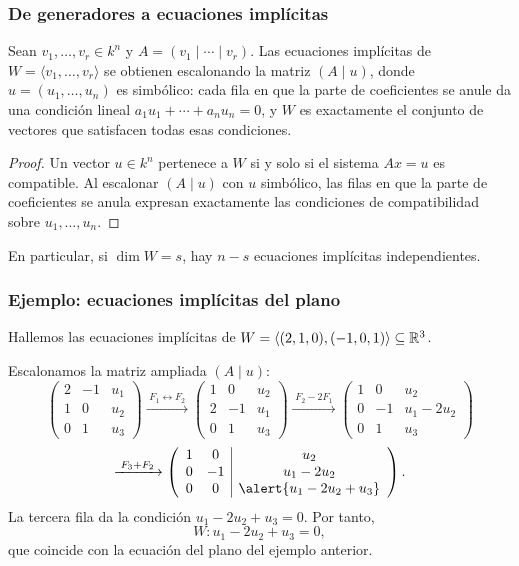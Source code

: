 \begin{frame}[allowframebreaks, t]
    \frametitle{De generadores a ecuaciones implícitas}

    \begin{proposition}
        Sean $v_1,\ldots,v_r\in k^n$ y $A=(v_1\mid\cdots\mid v_r)$.
        Las ecuaciones implícitas de $W=\langle v_1,\ldots,v_r\rangle$
        se obtienen escalonando la matriz $(A\mid u)$, donde
        $u=(u_1,\ldots,u_n)$ es simbólico: cada fila en que la parte
        de coeficientes se anule da una condición lineal
        $a_1u_1+\cdots+a_nu_n=0$, y $W$ es exactamente el conjunto de
        vectores que satisfacen todas esas condiciones.
    \end{proposition}

    \begin{proof}
        Un vector $u\in k^n$ pertenece a $W$ si y solo si el sistema
        $Ax=u$ es compatible. Al escalonar $(A\mid u)$ con $u$ simbólico,
        las filas en que la parte de coeficientes se anula expresan
        exactamente las condiciones de compatibilidad sobre $u_1,\ldots,u_n$.
    \end{proof}

    En particular, si $\dim W=s$, hay $n-s$ ecuaciones implícitas
    independientes.
\end{frame}


\begin{frame}[allowframebreaks, t]
    \frametitle{Ejemplo: ecuaciones implícitas del plano}

    \begin{example}
        Hallemos las ecuaciones implícitas de
        $W=\langle(2,1,0),(-1,0,1)\rangle\subseteq\mathbb{R}^3$.
    \end{example}

    Escalonamos la matriz ampliada $(A\mid u)$:
    \[
        \left(\begin{array}{cc|c}
            2&-1&u_1\\1&0&u_2\\0&1&u_3
        \end{array}\right)
        \xrightarrow{\;F_1\leftrightarrow F_2\;}
        \left(\begin{array}{cc|c}
            1&0&u_2\\2&-1&u_1\\0&1&u_3
        \end{array}\right)
        \xrightarrow{\;F_2-2F_1\;}
        \left(\begin{array}{cc|c}
            1&0&u_2\\0&-1&u_1-2u_2\\0&1&u_3
        \end{array}\right)
    \]
    \[
        \xrightarrow{\;F_3+F_2\;}
        \left(\begin{array}{cc|c}
            1&0&u_2\\0&-1&u_1-2u_2\\0&0&\alert{u_1-2u_2+u_3}
        \end{array}\right).
    \]
    La tercera fila da la condición $u_1-2u_2+u_3=0$. Por tanto,
    \[
        W\colon u_1-2u_2+u_3=0,
    \]
    que coincide con la ecuación del plano del ejemplo anterior.
\end{frame}

